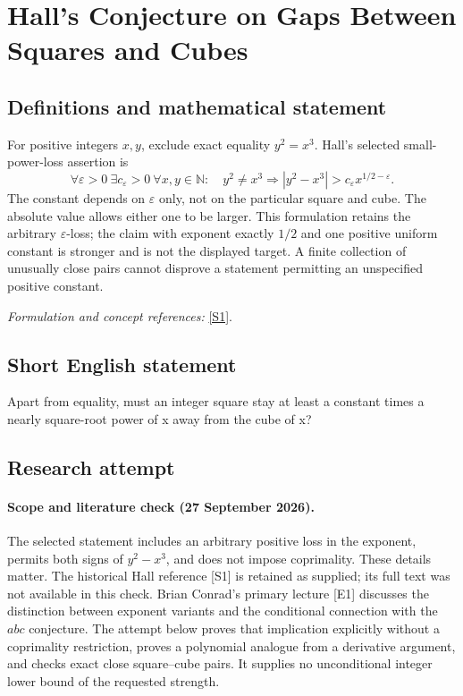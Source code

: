 \documentclass[11pt]{article}
\begin{document}
\section*{\texorpdfstring{Hall's Conjecture on Gaps Between Squares and Cubes}{Hall's Conjecture on Gaps Between Squares and Cubes}}\label{465}
\subsection{Definitions and mathematical statement}
For positive integers $x,y$, exclude exact equality $y^2=x^3$. Hall's selected small-power-loss assertion is
\[
 \forall{\varepsilon}>0\ \exists c_{\varepsilon}>0\ \forall x,y\in{\mathbb{N}}:\quad
 y^2\ne x^3\Longrightarrow
 |y^2-x^3|>c_{\varepsilon} x^{1/2-{\varepsilon}}.
\]
The constant depends on ${\varepsilon}$ only, not on the particular square and cube. The absolute value allows either one to be larger. This formulation retains the arbitrary ${\varepsilon}$-loss; the claim with exponent exactly $1/2$ and one positive uniform constant is stronger and is not the displayed target. A finite collection of unusually close pairs cannot disprove a statement permitting an unspecified positive constant.
\par\smallskip\textit{Formulation and concept references:} \href{https://doi.org/10.1007/BF01140190}{[S1]}.

\subsection{Short English statement}
Apart from equality, must an integer square stay at least a constant times a nearly square-root power of x away from the cube of x?
\subsection{Research attempt}
\paragraph{Scope and literature check (27 September 2026).}
The selected statement includes an arbitrary positive loss in the exponent, permits both signs of $y^2-x^3$, and does not impose coprimality. These details matter. The historical Hall reference [S1] is retained as supplied; its full text was not available in this check. Brian Conrad's primary lecture [E1] discusses the distinction between exponent variants and the conditional connection with the $abc$ conjecture. The attempt below proves that implication explicitly without a coprimality restriction, proves a polynomial analogue from a derivative argument, and checks exact close square--cube pairs. It supplies no unconditional integer lower bound of the requested strength.
\end{document}
